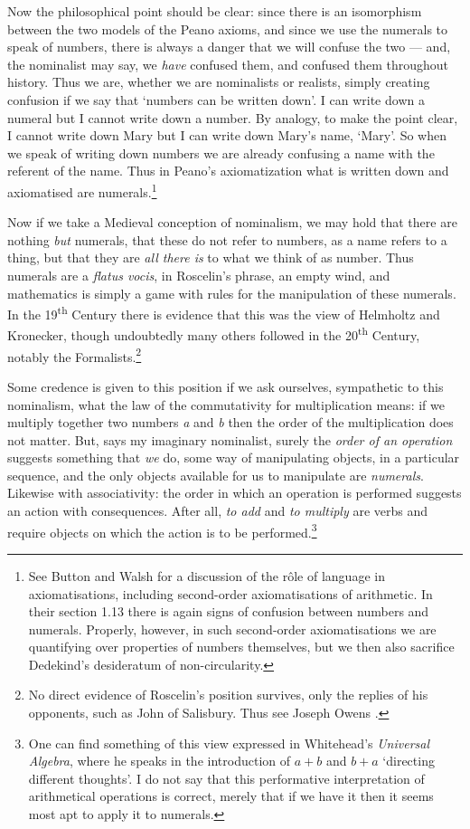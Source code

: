 \documentclass[11pt,oneside,a4paper]{article}
\newcommand*{\thing}[1]{\hspace{0.75pt}\textit{#1}\hspace{1.5pt}\xspace}
\begin{document}
Now the philosophical point should be clear: since there is an isomorphism between the two models of the Peano axioms, and since we use the numerals to speak of numbers, there is always a danger that we will confuse the two --- and, the nominalist may say, we \emph{have} confused them, and confused them throughout history. Thus we are, whether we are nominalists or realists, simply creating confusion if we say that `numbers can be written down'. I can write down a numeral but I cannot write down a number. By analogy, to make the point clear, I cannot write down Mary but I can write down Mary's name, `Mary'. So when we speak of writing down numbers we are already confusing a name with the referent of the name. Thus in Peano's axiomatization what is written down and axiomatised are numerals.\footnote{See Button and Walsh \parencite*{button_philosophy_2018} for a  discussion of the rôle of language in axiomatisations, including second-order axiomatisations of arithmetic. In their section 1.13 there is again signs of confusion between numbers and numerals. Properly, however, in such second-order axiomatisations we are quantifying over properties of numbers themselves, but we then also sacrifice Dedekind's desideratum of non-circularity.}

Now if we take a Medieval conception of nominalism, we may hold that there are nothing \textit{but} numerals, that these do not refer to numbers, as a name refers to a thing, but that they are \textit{all there is} to what we think of as number. Thus numerals are a \textit{flatus vocis}, in Roscelin's phrase, an empty wind, and mathematics is simply a game with rules for the manipulation of these numerals. In the 19\textsuperscript{th} Century there is evidence that this was the view of Helmholtz and Kronecker, though undoubtedly many others followed in the 20\textsuperscript{th} Century, notably the Formalists.\footnote{No direct evidence of Roscelin's position survives, only the replies of his opponents, such as John of Salisbury. Thus see Joseph Owens \parencite*{owens_faith_1982}.} 

Some credence is given to this position if we ask ourselves, sympathetic to this nominalism, what the law of the commutativity for multiplication means: if we multiply together two numbers \thing{a} and \thing{b} then the order of the multiplication does not matter. But, says my imaginary nominalist, surely the \textit{order of an operation} suggests something that \textit{we} do, some way of manipulating objects, in a particular sequence, and the only objects available for us to manipulate are \textit{numerals}. Likewise with associativity: the order in which an operation is performed suggests an action with consequences. After all, \textit{to add} and \textit{to multiply} are verbs and require objects on which the action is to be performed.\footnote{One can find something of this view expressed in Whitehead's \textit{Universal Algebra}, where he speaks in the introduction of $a + b$ and $b + a$ `directing different thoughts'. I do not say that this performative interpretation of arithmetical operations is correct, merely that if we have it then it seems most apt to apply it to numerals.}
\end{document}
